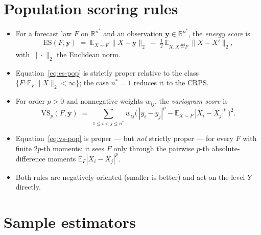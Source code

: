 \documentclass[11pt]{article}
\newcommand{\R}{\mathbb{R}}
\newcommand{\E}{\mathbb{E}}
\begin{document}
\section{Population scoring rules}
\label{sec:population}

\begin{itemize}[leftmargin=1.5em, itemsep=3pt]
  \item For a forecast law $F$ on $\R^{n^\ast}$ and an observation
        $\bm y\in\R^{n^\ast}$, the \emph{energy score}
        \cite{gneiting2007} is
        \begin{equation}
          \mathrm{ES}(F,\bm y)
            \;=\; \E_{X\sim F}\,\|X-\bm y\|_2
                 \;-\; \tfrac12\,
                 \E_{X,X'\overset{\text{iid}}{\sim}F}\,\|X-X'\|_2 ,
          \label{eq:es-pop}
        \end{equation}
        with $\|\cdot\|_2$ the Euclidean norm.
  \item Equation~\eqref{eq:es-pop} is strictly proper relative to the
        class $\{F:\E_F\|X\|_2<\infty\}$; the case $n^\ast=1$ reduces it
        to the $\mathrm{CRPS}$.
  \item For order $p>0$ and nonnegative weights $w_{ij}$, the
        \emph{variogram score} \cite{scheuerer2015} is
        \begin{equation}
          \mathrm{VS}_p(F,\bm y)
            \;=\; \sum_{1\le i<j\le n^\ast} w_{ij}
                  \Big(\,|y_i-y_j|^p
                       - \E_{X\sim F}\,|X_i-X_j|^p\,\Big)^{2}.
          \label{eq:vs-pop}
        \end{equation}
  \item Equation~\eqref{eq:vs-pop} is proper --- but \emph{not} strictly
        proper --- for every $F$ with finite $2p$-th moments: it sees $F$
        only through the pairwise $p$-th absolute-difference moments
        $\E_F|X_i-X_j|^p$.
  \item Both rules are negatively oriented (smaller is better) and act on
        the level $Y$ directly.
\end{itemize}

\section{Sample estimators}
\label{sec:estimators}
\end{document}
